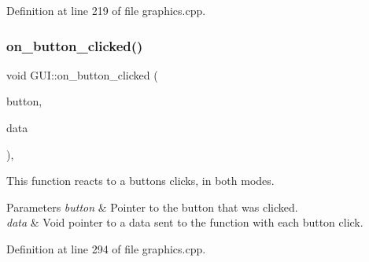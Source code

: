 Definition at line 219 of file graphics.\+cpp.


\begin{DoxyCode}{0}

\end{DoxyCode}
\mbox{\label{class_g_u_i_ab304a773588b83f791473af089954465}} 
\subsubsection{\texorpdfstring{on\_button\_clicked()}{on\_button\_clicked()}}
{\footnotesize\ttfamily void G\+U\+I\+::on\+\_\+button\+\_\+clicked (\begin{DoxyParamCaption}\item[{Gtk\+Button $\ast$}]{button,  }\item[{gpointer}]{data }\end{DoxyParamCaption})\hspace{0.3cm}{\ttfamily [static]}, {\ttfamily [protected]}}



This function reacts to a buttons clicks, in both modes. 


\begin{DoxyParams}{Parameters}
{\em button} & Pointer to the button that was clicked. \\
\hline
{\em data} & Void pointer to a data sent to the function with each button click. \\
\hline
\end{DoxyParams}


Definition at line 294 of file graphics.\+cpp.


